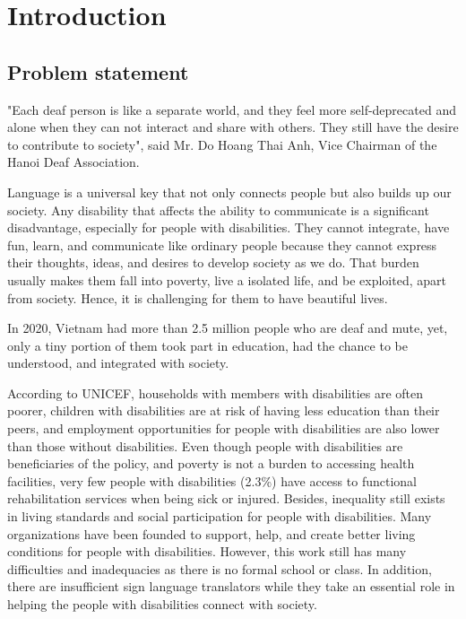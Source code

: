 \chapter{Introduction}
	
\section{Problem statement}

"Each deaf person is like a separate world, and they feel more self-deprecated and alone when they can not interact and share with others. They still have the desire to contribute to society", said Mr. Do Hoang Thai Anh, Vice Chairman of the Hanoi Deaf Association\cite{MoCanhCuaHyVong}.

Language is a universal key that not only connects people but also builds up our society. Any disability that affects the ability to communicate is a significant disadvantage, especially for people with disabilities. They cannot integrate, have fun, learn, and communicate like ordinary people because they cannot express their thoughts, ideas, and desires to develop society as we do. That burden usually makes them fall into poverty, live a isolated life, and be exploited, apart from society. Hence, it is challenging for them to have beautiful lives.

In 2020, Vietnam had more than 2.5 million people who are deaf and mute, yet, only a tiny portion of them took part in education, had the chance to be understood, and integrated with society\cite{ThieuPhienDich}.

According to UNICEF, households with members with disabilities are often poorer, children with disabilities are at risk of having less education than their peers, and employment opportunities for people with disabilities are also lower than those without disabilities. Even though people with disabilities are beneficiaries of the policy, and poverty is not a burden to accessing health facilities, very few people with disabilities (2.3\%) have access to functional rehabilitation services when being sick or injured. Besides, inequality still exists in living standards and social participation for people with disabilities. Many organizations have been founded to support, help, and create better living conditions for people with disabilities. However, this work still has many difficulties and inadequacies as there is no formal school or class. In addition, there are insufficient sign language translators while they take an essential role in helping the people with disabilities connect with society.

